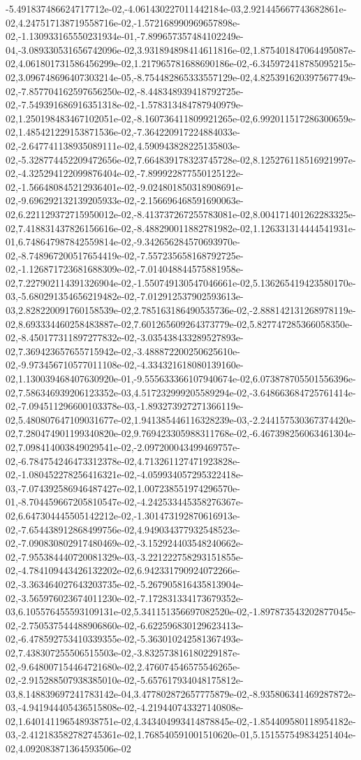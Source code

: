 -5.491837486624717712e-02,-4.061430227011442184e-03,2.921445667743682861e-02,4.247517138719558716e-02,-1.572168990969657898e-02,-1.130933165550231934e-01,-7.899657357484102249e-04,-3.089330531656742096e-02,3.931894898414611816e-02,1.875401847064495087e-02,4.061801731586456299e-02,1.217965781688690186e-02,-6.345972418785095215e-02,3.096748696407303214e-05,-8.754482865333557129e-02,4.825391620397567749e-02,-7.857704162597656250e-02,-8.448348939418792725e-02,-7.549391686916351318e-02,-1.578313484787940979e-02,1.250198483467102051e-02,-8.160736411809921265e-02,6.992011517286300659e-02,1.485421229153871536e-02,-7.364220917224884033e-02,-2.647741138935089111e-02,4.590943828225135803e-02,-5.328774452209472656e-02,7.664839178323745728e-02,8.125276118516921997e-02,-4.325294122099876404e-02,-7.899922877550125122e-02,-1.566480845212936401e-02,-9.024801850318908691e-02,-9.696292132139205933e-02,-2.156696468591690063e-02,6.221129372715950012e-02,-8.413737267255783081e-02,8.004171401262283325e-02,7.418831437826156616e-02,-8.488290011882781982e-02,1.126331314444541931e-01,6.748647987842559814e-02,-9.342656284570693970e-02,-8.748967200517654419e-02,-7.557235658168792725e-02,-1.126871723681688309e-02,-7.014048844575881958e-02,7.227902114391326904e-02,-1.550749130547046661e-02,5.136265419423580170e-03,-5.680291354656219482e-02,-7.012912537902593613e-03,2.828220091760158539e-02,2.785163186490535736e-02,-2.888142131268978119e-02,8.693334460258483887e-02,7.601265609264373779e-02,5.827747285366058350e-02,-8.450177311897277832e-02,-3.035438433289527893e-02,7.369423657655715942e-02,-3.488872200250625610e-02,-9.973456710577011108e-02,-4.334321618080139160e-02,1.130039468407630920e-01,-9.555633366107940674e-02,6.073878705501556396e-02,7.586346939206123352e-03,4.517232999205589294e-02,-3.648663684725761414e-02,-7.094511296600103378e-03,-1.893273927271366119e-02,5.480807647109031677e-02,1.941385446116328239e-03,-2.244157530367374420e-02,7.280474901199340820e-02,9.769423305988311768e-02,-6.467398256063461304e-02,7.098414003849029541e-02,-2.097200043499469757e-02,-6.784754246473312378e-02,4.713261127471923828e-02,-1.080452278256416321e-02,-4.059934057295322418e-03,-7.074392586946487427e-02,1.007238551974296570e-01,-8.704459667205810547e-02,-4.242533445358276367e-02,6.647304445505142212e-02,-1.301473192870616913e-02,-7.654438912868499756e-02,4.949034377932548523e-02,-7.090830802917480469e-02,-3.152924403548240662e-02,-7.955384440720081329e-03,-3.221222758293151855e-02,-4.784109443426132202e-02,6.942331790924072266e-02,-3.363464027643203735e-02,-5.267905816435813904e-02,-3.565976023674011230e-02,-7.172831334173679352e-03,6.105576455593109131e-02,5.341151356697082520e-02,-1.897873543202877045e-02,-2.750537544488906860e-02,-6.622596830129623413e-02,-6.478592753410339355e-02,-5.363010242581367493e-02,7.438307255506515503e-02,-3.832573816180229187e-02,-9.648007154464721680e-02,2.476074546575546265e-02,-2.915288507938385010e-02,-5.657617934048175812e-03,8.148839697241783142e-04,3.477802872657775879e-02,-8.935806341469287872e-03,-4.941944405436515808e-02,-4.219440743327140808e-02,1.640141196548938751e-02,4.343404993414878845e-02,-1.854409580118954182e-03,-2.412183582782745361e-02,1.768540591001510620e-01,5.151557549834251404e-02,4.092083871364593506e-02
